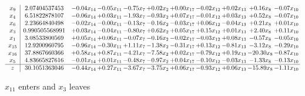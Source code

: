 \documentclass[9pt]{article}
\begin{document}
 \[\begin{array}{c| c c@{\hskip 2pt} c@{\hskip 2pt} c@{\hskip 2pt} c@{\hskip 2pt} c@{\hskip 2pt} c@{\hskip 2pt} c@{\hskip 2pt} c@{\hskip 2pt} c@{\hskip 2pt} }
 x_{9}   &  2.07404537453 & -0.04 x_{14} & -0.05 x_{11} & -0.75 x_{7} & +  0.02 x_{2} & +  0.00 x_{17} & -0.02 x_{12} & +  0.02 x_{13} & +  0.16 x_{8} & -0.07 x_{10}\\
 x_{4}   &  6.51822878107 & -0.06 x_{14} & +  0.03 x_{11} & -1.93 x_{7} & -0.93 x_{2} & +  0.07 x_{17} & -0.01 x_{12} & +  0.03 x_{13} & +  0.52 x_{8} & -0.07 x_{10}\\
 x_{6}   &  2.23664840498 & -0.02 x_{14} & -0.00 x_{11} & -0.13 x_{7} & -0.16 x_{2} & -0.03 x_{17} & +  0.06 x_{12} & -0.04 x_{13} & +  0.21 x_{8} & +  0.01 x_{10}\\
 x_{3}   &  0.990505568991 & +  0.03 x_{14} & -0.04 x_{11} & -0.80 x_{7} & +  0.62 x_{2} & +  0.05 x_{17} & +  0.15 x_{12} & +  0.01 x_{13} & +  2.40 x_{8} & +  0.11 x_{10}\\
 x_{1}   &  3.08533800569 & +  0.05 x_{14} & +  0.06 x_{11} & -0.07 x_{7} & -0.16 x_{2} & -0.02 x_{17} & -0.03 x_{12} & +  0.08 x_{13} & -0.57 x_{8} & -0.05 x_{10}\\
 x_{15}   &  12.9200960795 & -0.96 x_{14} & -0.30 x_{11} & +  1.11 x_{7} & -1.38 x_{2} & -0.31 x_{17} & +  0.13 x_{12} & -0.81 x_{13} & -3.12 x_{8} & -0.29 x_{10}\\
 x_{16}   &  37.8867660366 & +  0.58 x_{14} & +  0.87 x_{11} & -4.21 x_{7} & -7.58 x_{2} & +  0.02 x_{17} & -0.79 x_{12} & +  0.19 x_{13} & -20.30 x_{8} & -0.87 x_{10}\\
 x_{5}   &  4.83665827616 & -0.01 x_{14} & +  0.01 x_{11} & -0.48 x_{7} & -0.97 x_{2} & +  0.04 x_{17} & -0.10 x_{12} & -0.03 x_{13} & -1.33 x_{8} & -0.13 x_{10}\\
\hline
z    &  30.1051363046 & -0.44 x_{14} & +  0.27 x_{11} & -3.67 x_{7} & -3.75 x_{2} & +  0.06 x_{17} & -0.93 x_{12} & +  0.06 x_{13} & -15.89 x_{8} & -1.11 x_{10}\\
\end{array}\]


 $ x_{11} $ enters and $ x_{3} $ leaves 
\end{document}
